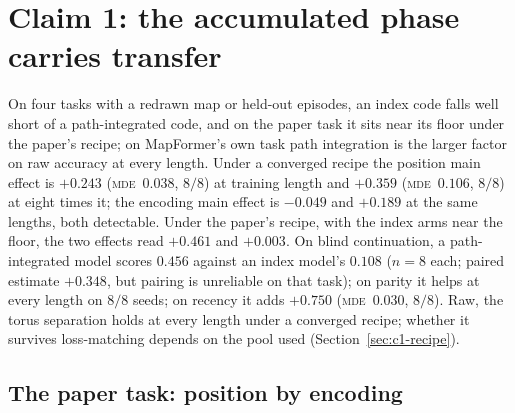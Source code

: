 \documentclass[10pt]{article}
\newcommand{\mde}{\textsc{mde}}
\begin{document}
\section{Claim 1: the accumulated phase carries transfer}
\label{sec:claim1}

On four tasks with a redrawn map or held-out episodes, an index code falls well short of a path-integrated
code, and on the paper task it sits near its floor under the paper's recipe; on MapFormer's own task path
integration is the larger factor on raw accuracy at every length. Under a converged recipe the position main effect is $+0.243$ (\mde\ $0.038$,
$8/8$) at training length and $+0.359$ (\mde\ $0.106$, $8/8$) at eight times it; the encoding main effect is
$-0.049$ and $+0.189$ at the same lengths, both detectable. Under the paper's recipe, with the index arms near
the floor, the two effects read $+0.461$ and $+0.003$.
On blind continuation, a path-integrated model scores $0.456$ against an
index model's $0.108$ ($n=8$ each; paired estimate $+0.348$, but pairing is unreliable on that task); on
parity it helps at every length on $8/8$ seeds; on recency
it adds $+0.750$ (\mde\ $0.030$, $8/8$). Raw, the torus separation holds at every length under a converged recipe; whether it survives
loss-matching depends on the pool used (Section~\ref{sec:c1-recipe}).

\subsection{The paper task: position by encoding}
\label{sec:c1-paper}
\end{document}
